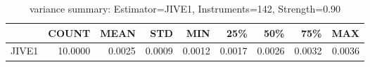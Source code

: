 \begin{table}[ht]
\centering
\caption{variance summary: Estimator=JIVE1, Instruments=142, Strength=0.90}
\begin{tabular}{lrrrrrrrr}
\toprule
 & COUNT & MEAN & STD & MIN & 25\% & 50\% & 75\% & MAX \\
\midrule
JIVE1 & 10.0000 & 0.0025 & 0.0009 & 0.0012 & 0.0017 & 0.0026 & 0.0032 & 0.0036 \\
\bottomrule
\end{tabular}
\end{table}
